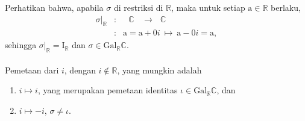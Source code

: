 	Perhatikan bahwa, apabila $\sigma$ di restriksi di $\mathbb{R}$, maka untuk setiap $\mathrm{a}\in \mathbb{R}$ berlaku,
	$$\begin{array}{rcl}
	\sigma|_{\mathbb{R}} &:& ~~~\mathbb{C} ~~~~\longrightarrow~~~ \mathbb{C}\\
	&:& \mathrm{a=a+0}i ~\mapsto ~\mathrm{a-0}i=\mathrm{a},
	\end{array}$$
	sehingga $\sigma|_{\mathbb{R}}=\mathrm{I}_{\mathbb{R}}$ dan $\sigma \in \mathrm{Gal}_{\mathbb{R}} \mathbb{C}.$
\\ \\
	Pemetaan dari $i$, dengan $i \notin \mathbb{R}$, yang mungkin adalah
	\begin{enumerate}
	\item $i \mapsto i$, yang merupakan pemetaan identitas $\iota \in \mathrm{Gal}_{\mathbb{R}} \mathbb{C}$, dan
	\item $i \mapsto -i$, $\sigma \ne \iota$.
	\end{enumerate}
	
